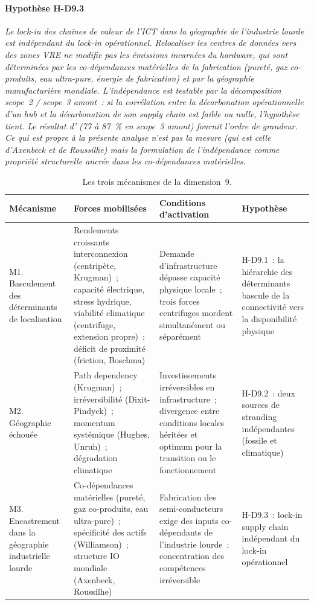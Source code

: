 \paragraph{Hypothèse H-D9.3} \emph{Le lock-in des chaînes de valeur de l'ICT dans la géographie de l'industrie lourde est indépendant du lock-in opérationnel. Relocaliser les centres de données vers des zones VRE ne modifie pas les émissions incarnées du hardware, qui sont déterminées par les co-dépendances matérielles de la fabrication (pureté, gaz co-produits, eau ultra-pure, énergie de fabrication) et par la géographie manufacturière mondiale. L'indépendance est testable par la décomposition scope~2 / scope~3 amont~: si la corrélation entre la décarbonation opérationnelle d'un hub et la décarbonation de son supply chain est faible ou nulle, l'hypothèse tient. Le résultat d'\textcite{axenbeck_global_2025} (77 à 87~\% en scope~3 amont) fournit l'ordre de grandeur. Ce qui est propre à la présente analyse n'est pas la mesure (qui est celle d'Axenbeck et de Roussilhe) mais la formulation de l'indépendance comme propriété structurelle ancrée dans les co-dépendances matérielles.}


\begin{table}[!ht]
\caption{Les trois mécanismes de la dimension~9.}\label{tab:d9-mecanismes}
\centering\footnotesize
\renewcommand{\arraystretch}{1.25}
\begin{tabularx}{\textwidth}{@{}p{2.4cm}p{3.2cm}p{3.8cm}X@{}}
\toprule
\textbf{Mécanisme} & \textbf{Forces mobilisées} & \textbf{Conditions d'activation} & \textbf{Hypothèse} \\
\midrule
M1. Basculement des déterminants de localisation & Rendements croissants interconnexion (centripète, Krugman)~; capacité électrique, stress hydrique, viabilité climatique (centrifuge, extension propre)~; déficit de proximité (friction, Boschma) & Demande d'infrastructure dépasse capacité physique locale~; trois forces centrifuges mordent simultanément ou séparément & H-D9.1~: la hiérarchie des déterminants bascule de la connectivité vers la disponibilité physique \\[4pt]
M2. Géographie échouée & Path dependency (Krugman)~; irréversibilité (Dixit-Pindyck)~; momentum systémique (Hughes, Unruh)~; dégradation climatique & Investissements irréversibles en infrastructure~; divergence entre conditions locales héritées et optimum pour la transition ou le fonctionnement & H-D9.2~: deux sources de stranding indépendantes (fossile et climatique) \\[4pt]
M3. Encastrement dans la géographie industrielle lourde & Co-dépendances matérielles (pureté, gaz co-produits, eau ultra-pure)~; spécificité des actifs (Williamson)~; structure IO mondiale (Axenbeck, Roussilhe) & Fabrication des semi-conducteurs exige des inputs co-dépendants de l'industrie lourde~; concentration des compétences irréversible & H-D9.3~: lock-in supply chain indépendant du lock-in opérationnel \\
\bottomrule
\end{tabularx}
\renewcommand{\arraystretch}{1.0}
\end{table}

